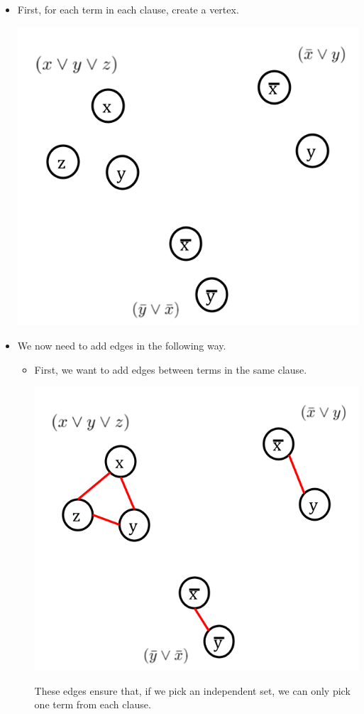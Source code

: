 \documentclass[letterpaper]{article}
\begin{document}
\begin{itemize}
    \item First, for each term in each clause, create a vertex.
    \begin{center}
        \includegraphics[scale=0.4]{../assets/3sat_mis_1.png}
    \end{center}

    \item We now need to add edges in the following way. 
    \begin{itemize}
        \item First, we want to add edges between terms in the same clause.
        \begin{center}
            \includegraphics[scale=0.4]{../assets/3sat_mis_2.png}
        \end{center}
        These edges ensure that, if we pick an independent set, we can only pick one term from each clause. 


\end{itemize}
\end{itemize}
\end{document}
